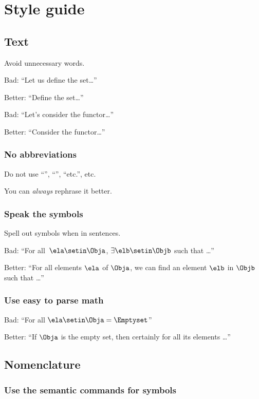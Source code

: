 
\section{Style guide}
\subsection*{Text}

Avoid unnecessary words.

Bad: ``Let us define the set\dots''

Better: ``Define the set\dots''

Bad: ``Let's consider the functor\dots''

Better: ``Consider the functor\dots ''

\subsubsection*{No abbreviations}
Do not use ``\ie '', ``\eg '', ``etc.'', etc.

You can \emph{always} rephrase it better.

\subsubsection*{Speak the symbols}
Spell out symbols when in sentences.

Bad: ``For all~$\ela \setin \Obja$, $\exists \elb \setin \Objb$ such that \dots''

Better: ``For all elements $\ela$ of $\Obja$, we can find an element $\elb$ in $\Objb$ such that \dots''

\subsubsection*{Use easy to parse math}

Bad: ``For all $\ela\setin \Obja=\Emptyset$''

Better: ``If $\Obja$ is the empty set, then certainly for all its elements \dots''

\subsection*{Nomenclature}

\subsubsection*{Use the semantic commands for symbols}

